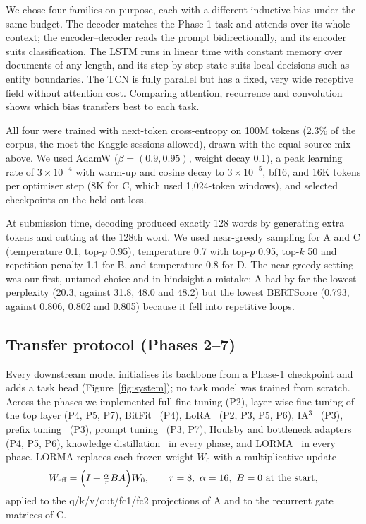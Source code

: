 \documentclass[11pt, oneside]{article}
\newcommand{\A}{\textsf{A}}\newcommand{\B}{\textsf{B}}\newcommand{\C}{\textsf{C}}\newcommand{\D}{\textsf{D}}
\begin{document}
We chose four families on purpose, each with a different inductive bias under the same budget. The decoder matches the Phase-1 task and attends over its whole context; the encoder--decoder reads the prompt bidirectionally, and its encoder suits classification. The LSTM runs in linear time with constant memory over documents of any length, and its step-by-step state suits local decisions such as entity boundaries. The TCN is fully parallel but has a fixed, very wide receptive field without attention cost. Comparing attention, recurrence and convolution shows which bias transfers best to each task.

All four were trained with next-token cross-entropy on 100M tokens (2.3\% of the corpus, the most the Kaggle sessions allowed), drawn with the equal source mix above. We used AdamW ($\beta=(0.9,0.95)$, weight decay 0.1), a peak learning rate of $3\times10^{-4}$ with warm-up and cosine decay to $3\times10^{-5}$, bf16, and 16K tokens per optimiser step (8K for \C{}, which used 1,024-token windows), and selected checkpoints on the held-out loss.

At submission time, decoding produced exactly 128 words by generating extra tokens and cutting at the 128th word. We used near-greedy sampling for \A{} and \C{} (temperature 0.1, top-$p$ 0.95), temperature 0.7 with top-$p$ 0.95, top-$k$ 50 and repetition penalty 1.1 for \B{}, and temperature 0.8 for \D{}. The near-greedy setting was our first, untuned choice and in hindsight a mistake: \A{} had by far the lowest perplexity (20.3, against 31.8, 48.0 and 48.2) but the lowest BERTScore (0.793, against 0.806, 0.802 and 0.805) because it fell into repetitive loops.

\subsection{Transfer protocol (Phases 2--7)}
Every downstream model initialises its backbone from a Phase-1 checkpoint and adds a task head (Figure~\ref{fig:system}); no task model was trained from scratch. Across the phases we implemented full fine-tuning (P2), layer-wise fine-tuning of the top layer (P4, P5, P7), BitFit~\cite{benzaken2022bitfit} (P4), LoRA~\cite{hu2022lora} (P2, P3, P5, P6), IA$^3$~\cite{liu2022ia3} (P3), prefix tuning~\cite{li2021prefix} (P3), prompt tuning~\cite{lester2021prompt} (P3, P7), Houlsby and bottleneck adapters~\cite{houlsby2019adapters} (P4, P5, P6), knowledge distillation~\cite{hinton2015distilling} in every phase, and LORMA~\cite{bihany2025lorma} in every phase. LORMA replaces each frozen weight $W_0$ with a multiplicative update
\begin{equation}
W_{\text{eff}} = \Bigl(I + \tfrac{\alpha}{r} B A\Bigr) W_0, \qquad r=8,\ \alpha=16,\ B=0 \text{ at the start},
\end{equation}
applied to the q/k/v/out/fc1/fc2 projections of \A{} and to the recurrent gate matrices of \C{}.
\end{document}
